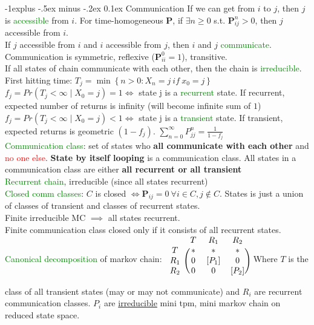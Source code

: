 \documentclass[landscape]{article}
\makeatletter
\renewcommand{\subsection}{\@startsection{subsection}{2}{0mm}%
                                {-1explus -.5ex minus -.2ex}%
                                {0.1ex}%
                                {\color{orange}\normalfont\normalsize\bfseries}}
\makeatother
\begin{document}
\begin{multicols*}{3}
\subsection{Communication}
If we can get from $i$ to $j$, then $j$ is
\textcolor{green}{accessible} from $i$. For time-homogeneous
$\mathbf{P}$, if $\exists n \geq 0$ s.t. $\mathbf{P}_{ij}^n > 0$, then
$j$ accessible from $i$.  \\If $j$ accessible from $i$ and $i$
accessible from $j$, then $i$ and $j$
\textcolor{green}{communicate}. Communication is symmetric, reflexive
($\mathbf{P}_{ii}^0 = 1$), transitive.  \\If all states of chain
communicate with each other, then the chain is
\textcolor{green}{irreducible}.  \\ First hitting time:
$T_j = \min \left\{n > 0 : X_n = j\ if\ x_0 = j\right\}$ \\
$f_j = Pr(T_j < \infty \mid X_0 = j) = 1\iff$ state j is a
\textcolor{green}{recurrent} state. If recurrent, expected number of
returns is infinity (will become infinite sum of $1$) \\
$f_j = Pr(T_j < \infty \mid X_0 = j) < 1 \iff$ state j is a
\textcolor{green}{transient} state. If transient, expected returns is
geometric $(1- f_j)$.  $\sum_{n = 0}^\infty P^n_{jj} = \frac{1}{1-f_j}$\\ \textcolor{green}{Communication class}: set
of states who \textbf{all communicate with each other} and
\textcolor{red}{no one else}. \textbf{State by itself looping} is a
communication class. All states in a communication class are either
\textbf{all recurrent or all transient} \\ \textcolor{green}{Recurrent
chain}, irreducible (since all states recurrent) \\ \textcolor{green}{Closed
  comm classes}: $C$ is closed
$\iff \mathbf{P}_{ij} = 0 \ \forall i \in C, j \notin C$. States is
just a union of classes of transient and classes of recurrent states.
\\ Finite irreducible MC $\implies$ all states recurrent.
\\ Finite communication class closed only if it consists of all recurrent states.
\\ \textcolor{green}{Canonical decomposition} of markov chain:
$ \begin{blockarray}{cccc}
  & T & R_1 & R_2 \\
  \begin{block}{c(ccc)}
    T & * & * & * \\ R_1 & 0 & [P_1] & 0 \\ R_2 & 0 & 0 & [P_2]
    \\
  \end{block}
\end{blockarray}$ Where $T$ is the class of all transient states (may
or may not communicate) and $R_i$ are recurrent communication
classes. $P_i$ are \underline{irreducible} mini tpm, mini markov chain
on reduced state space.

\end{multicols*}
\end{document}
